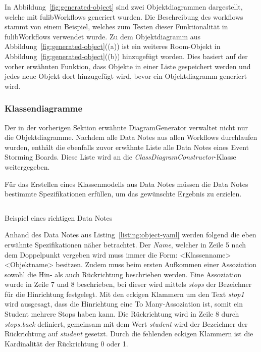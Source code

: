 In Abbildung~\ref{fig:generated-object} sind zwei Objektdiagrammen dargestellt, welche mit fulibWorkflows generiert wurden.
Die Beschreibung des workflows stammt von einem Beispiel, welches zum Testen dieser Funktionalität in fulibWorkflows verwendet wurde.\cite*{objectGenerate}
Zu dem Objektdiagramm aus Abbildung~\ref{fig:generated-object}((a)) ist ein weiteres Room-Objekt in Abbildung~\ref{fig:generated-object}((b)) hinzugefügt worden.
Dies basiert auf der vorher erwähnten Funktion, dass Objekte in einer Liste gespeichert werden und jedes neue Objekt dort hinzugefügt wird, bevor ein Objektdiagramm generiert wird.

\subsubsection{Klassendiagramme}
Der in der vorherigen Sektion erwähnte DiagramGenerator verwaltet nicht nur die Objektdiagramme.
Nachdem alle Data Notes aus allen Workflows durchlaufen wurden, enthält die ebenfalls zuvor erwähnte Liste alle Data Notes eines Event Storming Boards.
Diese Liste wird an die \textit{ClassDiagramConstructor}-Klasse weitergegeben.

Für das Erstellen eines Klassenmodells aus Data Notes müssen die Data Notes bestimmte Spezifikationen erfüllen, um das gewünschte Ergebnis zu erzielen.

\begin{listing}[!ht]
    \inputminted[xleftmargin=20pt,linenos,firstnumber=5]{yaml}{listings/3.1.4/data.es.yaml}
    \caption{Beispiel eines richtigen Data Notes}
    \label{listing:object-yaml}
\end{listing}

Anhand des Data Notes aus Listing~\ref{listing:object-yaml} werden folgend die eben erwähnte Spezifikationen näher betrachtet.
Der \textit{Name}, welcher in Zeile 5 nach dem Doppelpunkt vergeben wird muss immer die Form: <Klassenname> <Objektname> besitzen.
Zudem muss beim ersten Aufkommen einer Assoziation sowohl die Hin- als auch Rückrichtung beschrieben werden.
Eine Assoziation wurde in Zeile 7 und 8 beschrieben, bei dieser wird mittels \textit{stops} der Bezeichner für die Hinrichtung festgelegt.
Mit den eckigen Klammern um den Text \textit{stop1} wird ausgesagt, dass die Hinrichtung eine To Many-Assoziation ist, somit ein Student mehrere Stops haben kann.
Die Rückrichtung wird in Zeile 8 durch \textit{stops.back} definiert, gemeinsam mit dem Wert \textit{student} wird der Bezeichner
der Rückrichtung auf \textit{student} gesetzt.
Durch die fehlenden eckigen Klammern ist die Kardinalität der Rückrichtung 0 oder 1.

